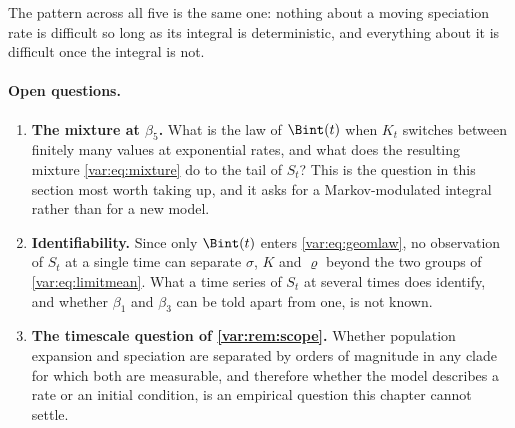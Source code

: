 The pattern across all five is the same one: nothing about a moving
speciation rate is difficult so long as its integral is deterministic, and
everything about it is difficult once the integral is not.

\paragraph{Open questions.}\label{var:rem:open-speciation}
\begin{enumerate}[leftmargin=1.6em,itemsep=0.2em,topsep=0.2em]
\item \textbf{The mixture at $\beta_5$.} What is the law of $\Bint(t)$ when
$K_t$ switches between finitely many values at exponential rates, and what
does the resulting mixture \cref{var:eq:mixture} do to the tail of $S_t$?
This is the question in this section most worth taking up, and it asks for a
Markov-modulated integral rather than for a new model.
\item \textbf{Identifiability.} Since only $\Bint(t)$ enters
\cref{var:eq:geomlaw}, no observation of $S_t$ at a single time can separate
$\sigma$, $K$ and $\varrho$ beyond the two groups of
\cref{var:eq:limitmean}. What a time series of $S_t$ at several times does
identify, and whether $\beta_1$ and $\beta_3$ can be told apart from one, is
not known.
\item \textbf{The timescale question of \cref{var:rem:scope}.} Whether
population expansion and speciation are separated by orders of magnitude in
any clade for which both are measurable, and therefore whether the model
describes a rate or an initial condition, is an empirical question this
chapter cannot settle.
\end{enumerate}

\FloatBarrier
